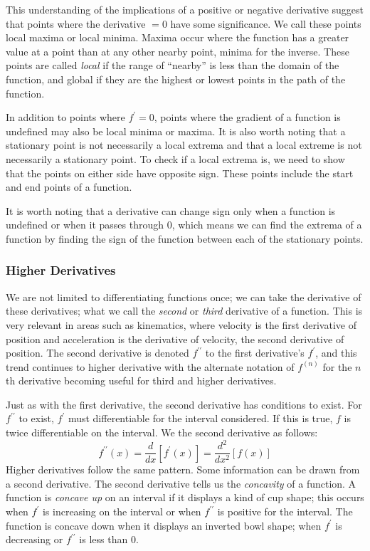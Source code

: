 \documentclass[12pt]{report}
\begin{document}
\begin{flushleft}
\bigskip
This understanding of the implications of a positive or negative derivative
suggest that points where the derivative \(= 0\) have some significance. We 
call these points local maxima or local minima. Maxima occur where the function
has a greater value at a point than at any other nearby point, minima for the
inverse. These points are called \textit{local} if the range of ``nearby'' is
less than the domain of the function, and global if they are the highest or 
lowest points in the path of the function.

\bigskip
In addition to points where \(f^\prime = 0\), points where the gradient of a
function is undefined may also be local minima or maxima. It is also worth 
noting that a stationary point is not necessarily a local extrema and that a
local extreme is not necessarily a stationary point. To check if a local 
extrema is, we need to show that the points on either side have opposite sign.
These points include the start and end points of a function.

\bigskip
It is worth noting that a derivative can change sign only when a function is 
undefined or when it passes through \(0\), which means we can find the extrema
of a function by finding the sign of the function between each of the 
stationary points.

\subsubsection*{Higher Derivatives}
We are not limited to differentiating functions once; we can take the 
derivative of these derivatives; what we call the \textit{second} or 
\textit{third} derivative of a function. This is very relevant in areas such
as kinematics, where velocity is the first derivative of position and 
acceleration is the derivative of velocity, the second derivative of position.
The second derivative is denoted \(f^{\prime\prime}\) to the first derivative's
\(f^\prime\), and this trend continues to higher derivative with the alternate
notation of \(f^{(n)}\) for the \(n\)th derivative becoming useful for third 
and higher derivatives.

\bigskip
Just as with the first derivative, the second derivative has conditions to 
exist. For \(f^{\prime\prime}\) to exist, \(f^\prime\) must differentiable for
the interval considered. If this is true, \(f\) is twice differentiable on the
interval. We the second derivative as follows:
\[f^{\prime\prime}(x) = \frac{d}{dx}[f^\prime(x)] = \frac{d^2}{dx^2}[f(x)]\]
Higher derivatives follow the same pattern. Some information can be drawn from
a second derivative. The second derivative tells us the \textit{concavity} of a
function. A function is \textit{concave up} on an interval if it displays a 
kind of cup shape; this occurs when \(f^\prime\) is increasing on the interval
or when \(f^{\prime\prime}\) is positive for the interval. The function is 
concave down when it displays an inverted bowl shape; when \(f^\prime\) is
decreasing or \(f^{\prime\prime}\) is less than \(0\).


\end{flushleft}
\end{document}
